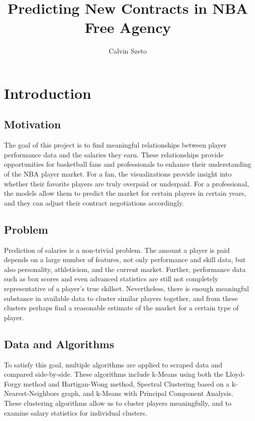 \documentclass{article}
\title{Predicting New Contracts in NBA Free Agency}
\begin{document}
\author{Calvin Szeto}
\maketitle
\section{Introduction}

\subsection{Motivation}

The goal of this project is to find meaningful relationships between player performance data and the salaries they earn. These relationships provide opportunities for basketball fans and professionals to enhance their understanding of the NBA player market. For a fan, the visualizations provide insight into whether their favorite players are truly overpaid or underpaid. For a professional, the models allow them to predict the market for certain players in certain years, and they can adjust their contract negotiations accordingly.

\subsection{Problem}

Prediction of salaries is a non-trivial problem. The amount a player is paid depends on a large number of features, not only performance and skill data, but also personality, athleticism, and the current market. Further, performance data such as box scores and even advanced statistics are still not completely representative of a player's true skillset. Nevertheless, there is enough meaningful substance in available data to cluster similar players together, and from these clusters perhaps find a reasonable estimate of the market for a certain type of player. 

\subsection{Data and Algorithms}

To satisfy this goal, multiple algorithms are applied to scraped data and compared side-by-side. These algorithms include k-Means using both the Lloyd-Forgy method and Hartigan-Wong method, Spectral Clustering based on a k-Nearest-Neighbors graph, and k-Means with Principal Component Analysis. These clustering algorithms allow us to cluster players meaningfully, and to examine salary statistics for individual clusters.
\end{document}
